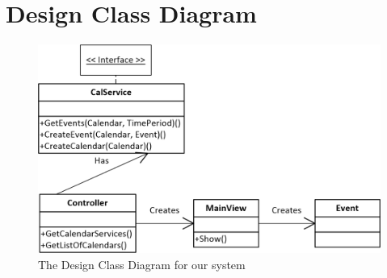 \section{Design Class Diagram}
\begin{figure}[h!]
  \includegraphics[width=\textwidth,natwidth=1182,natheight=723]{illustrations/DesignClassDiagram.png}
  \caption{The Design Class Diagram for our system}
\end{figure}
\newpage